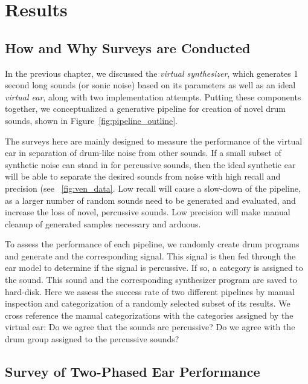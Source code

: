 \documentclass[\main/thesis.tex]{subfiles}
\begin{document}
\chapter{Results}
\newcommand{\decfirst}{\textit{Decision.1}}
\newcommand{\decsecond}{\textit{Decision.2}}

\label{gens}
\label{surveys}
\section{How and Why Surveys are Conducted}
 In the previous chapter, we discussed the \emph{virtual synthesizer}, which generates 1 second long sounds (or sonic noise) based on its parameters as well as an ideal \emph{virtual ear}, along with two implementation attempts. Putting these components together, we conceptualized a generative pipeline for creation of novel drum sounds, shown in Figure~\ref{fig:pipeline_outline}.
 
The surveys here are mainly designed to measure the performance of the virtual ear in separation of drum-like noise from other sounds. If a small subset of synthetic noise can stand in for percussive sounds, then the ideal synthetic ear will be able to separate the desired sounds from noise with high recall and precision (see ~\ref{fig:ven_data}. Low recall will cause a slow-down of the pipeline, as a larger number of random sounds need to be generated and evaluated, and increase the loss of novel, percussive sounds. Low precision will make manual cleanup of generated samples necessary and arduous. 

To assess the performance of each pipeline, we randomly create drum programs and generate and the corresponding signal. This signal is then fed through the ear model to determine if the signal is percussive. If so, a category is assigned to the sound. This sound and the corresponding synthesizer program are saved to hard-disk. Here we assess the success rate of two different pipelines by manual inspection and categorization of a randomly selected subset of its results. We cross reference the manual categorizations with the categories assigned by the virtual ear: Do we agree that the sounds are percussive? Do we agree with the drum group assigned to the percussive sounds?
 
 \section{Survey of Two-Phased Ear Performance}
   
\end{document}
